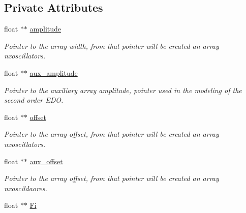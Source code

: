 \subsection*{Private Attributes}
\begin{DoxyCompactItemize}
\item 
float $\ast$$\ast$ \hyperlink{classCpg_ab69c24779052ba5cc8e510b71562945f}{amplitude}\hypertarget{classCpg_ab69c24779052ba5cc8e510b71562945f}{}\label{classCpg_ab69c24779052ba5cc8e510b71562945f}

\begin{DoxyCompactList}\small\item\em Pointer to the array width, from that pointer will be created an array nxoscillators. \end{DoxyCompactList}\item 
float $\ast$$\ast$ \hyperlink{classCpg_abefe83cdfd37126adb02aec6810246eb}{aux\+\_\+amplitude}\hypertarget{classCpg_abefe83cdfd37126adb02aec6810246eb}{}\label{classCpg_abefe83cdfd37126adb02aec6810246eb}

\begin{DoxyCompactList}\small\item\em Pointer to the auxiliary array amplitude, pointer used in the modeling of the second order E\+DO. \end{DoxyCompactList}\item 
float $\ast$$\ast$ \hyperlink{classCpg_ab407512343adf0ece4c570f7d33a3a74}{offset}\hypertarget{classCpg_ab407512343adf0ece4c570f7d33a3a74}{}\label{classCpg_ab407512343adf0ece4c570f7d33a3a74}

\begin{DoxyCompactList}\small\item\em Pointer to the array offset, from that pointer will be created an array nxoscillators. \end{DoxyCompactList}\item 
float $\ast$$\ast$ \hyperlink{classCpg_a1c6e8f93aed513fb523af2a8b47018fb}{aux\+\_\+offset}\hypertarget{classCpg_a1c6e8f93aed513fb523af2a8b47018fb}{}\label{classCpg_a1c6e8f93aed513fb523af2a8b47018fb}

\begin{DoxyCompactList}\small\item\em Pointer to the array offset, from that pointer will be created an array nxoscildaores. \end{DoxyCompactList}\item 
float $\ast$$\ast$ \hyperlink{classCpg_a80467f511271f69ea5b66df7991c4293}{Fi}\hypertarget{classCpg_a80467f511271f69ea5b66df7991c4293}{}\label{classCpg_a80467f511271f69ea5b66df7991c4293}


\end{DoxyCompactItemize}
